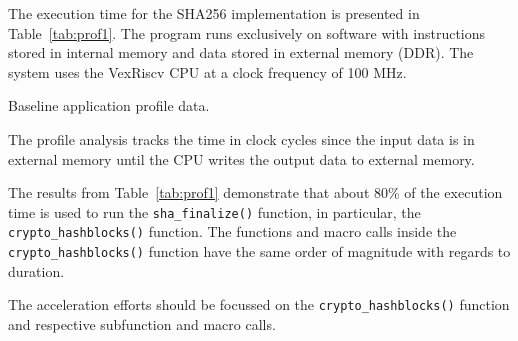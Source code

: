 The execution time for the SHA256 implementation \cite{iob-soc-opencryptohw} is
presented in Table~\ref{tab:prof1}. The program runs exclusively on software
with instructions stored in internal memory and data stored in external memory
(DDR). The system uses the VexRiscv CPU \cite{iob-vexriscv} at a clock
frequency of 100 MHz.

\begin{table}[h]
    \centering
    
    \caption{Baseline application profile data.}
    \label{tab:prof1}
\end{table}

The profile analysis tracks the time in clock cycles since the input data is in
external memory until the CPU writes the output data to external memory.

The results from Table~\ref{tab:prof1} demonstrate that about 80\% of the
execution time is used to run the \texttt{sha\_finalize()} function, in
particular, the \texttt{crypto\_hashblocks()} function. The functions and macro
calls inside the \texttt{crypto\_hashblocks()} function have the same order of
magnitude with regards to duration.

The acceleration efforts should be focussed on the
\texttt{crypto\_hashblocks()} function and respective subfunction and macro
calls.
